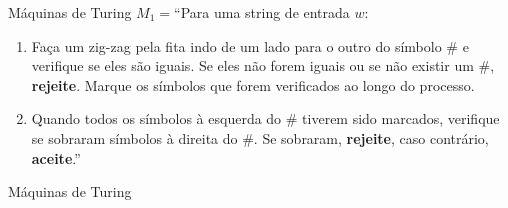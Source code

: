 \documentclass{beamer}
\begin{document}
\begin{frame}{Máquinas de Turing}
	$M_{1} = $``Para uma string de entrada $w$:
	\begin{enumerate}
		\item Faça um zig-zag pela fita indo de um lado para o outro do símbolo \# e verifique se eles são iguais. Se eles não forem iguais ou se não existir um \#, \textbf{rejeite}. Marque os símbolos que forem verificados ao longo do processo.
		\item Quando todos os símbolos à esquerda do \# tiverem sido marcados, verifique se sobraram símbolos à direita do \#. Se sobraram, \textbf{rejeite}, caso contrário, \textbf{aceite}.''
	\end{enumerate}
\end{frame}
\begin{frame}{Máquinas de Turing}
	\begin{center}
		\renewcommand{\TuringInput} {0,1,0,\#,0,1,0,$\sqcup$}
		\renewcommand{\TuringState} {$-$}
		\renewcommand{\TuringRightEnd} {$\ldots$}
		\renewcommand{\TuringLeftEnd} {}
		
		\only<2->{\renewcommand{\TuringInput}{x,1,0,\#,0,1,0,$\sqcup$}}%
		\only<2>{\renewcommand{\TuringHead}{2}\TuringMachine}%
		\only<3>{\renewcommand{\TuringHead}{3}\TuringMachine}%
		\only<4>{\renewcommand{\TuringHead}{4}\TuringMachine}%
		\only<5>{\renewcommand{\TuringHead}{5}\TuringMachine}%
		\only<6->{\renewcommand{\TuringInput} {x,1,0,\#,x,1,0,$\sqcup$}}%
		\only<6>{\renewcommand{\TuringHead}{4}\TuringMachine}%
		\only<7>{\renewcommand{\TuringHead}{3}\TuringMachine}%
		\only<8>{\renewcommand{\TuringHead}{2}\TuringMachine}%
		\only<9->{\renewcommand{\TuringInput}{x,x,0,\#,x,1,0,$\sqcup$}}%
		\only<9>{\renewcommand{\TuringHead}{3}\TuringMachine}%
		\only<10>{\renewcommand{\TuringHead}{4}\TuringMachine}%
		\only<11>{\renewcommand{\TuringHead}{5}\TuringMachine}%
		\only<12>{\renewcommand{\TuringHead}{6}\TuringMachine}%
		\only<13->{\renewcommand{\TuringInput}{x,x,0,\#,x,x,0,$\sqcup$}}%
		\only<13>{\renewcommand{\TuringHead}{5}\TuringMachine}%
		\only<14>{\renewcommand{\TuringHead}{4}\TuringMachine}%
		\only<15>{\renewcommand{\TuringHead}{3}\TuringMachine}%
		\only<16->{\renewcommand{\TuringInput}{x,x,x,\#,x,x,0,$\sqcup$}}%
		\only<16>{\renewcommand{\TuringHead}{4}\TuringMachine}%
		\only<17>{\renewcommand{\TuringHead}{5}\TuringMachine}%
		\only<18>{\renewcommand{\TuringHead}{6}\TuringMachine}%
		\only<19>{\renewcommand{\TuringHead}{7}\TuringMachine}%
		\only<20->{\renewcommand{\TuringInput}{x,x,x,\#,x,x,x,$\sqcup$}\renewcommand{\TuringHeadColor}{green}}%
		\only<20>{\renewcommand{\TuringHead}{8}\TuringMachine}%
	\end{center}
\end{frame}
\end{document}
